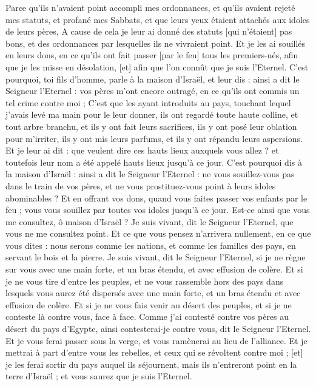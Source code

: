 \begin{multicols}{2}
Parce qu'ils n'avaient point accompli mes ordonnances, et qu'ils avaient rejeté mes statuts, et profané mes Sabbats, et que leurs yeux étaient attachés aux idoles de leurs pères,
A cause de cela je leur ai donné des statuts [qui n'étaient] pas bons, et des ordonnances par lesquelles ils ne vivraient point.
Et je les ai souillés en leurs dons, en ce qu'ils ont fait passer [par le feu] tous les premiers-nés, afin que je les misse en désolation, [et] afin que l'on connût que je suis l'Eternel.
C'est pourquoi, toi fils d'homme, parle à la maison d'Israël, et leur dis : ainsi a dit le Seigneur l'Eternel : vos pères m'ont encore outragé, en ce qu'ils ont commis un tel crime contre moi ;
C'est que les ayant introduits au pays, touchant lequel j'avais levé ma main pour le leur donner, ils ont regardé toute haute colline, et tout arbre branchu, et ils y ont fait leurs sacrifices, ils y ont posé leur oblation pour m'irriter, ils y ont mis leurs parfums, et ils y ont répandu leurs aspersions.
Et je leur ai dit : que veulent dire ces hauts lieux auxquels vous allez ? et toutefois leur nom a été appelé hauts lieux jusqu'à ce jour.
C'est pourquoi dis à la maison d'Israël : ainsi a dit le Seigneur l'Eternel : ne vous souillez-vous pas dans le train de vos pères, et ne vous prostituez-vous point à leurs idoles abominables ?
Et en offrant vos dons, quand vous faites passer vos enfants par le feu ; vous vous souillez par toutes vos idoles jusqu'à ce jour. Est-ce ainsi que vous me consultez, ô maison d'Israël ? Je suis vivant, dit le Seigneur l'Eternel, que vous ne me consultez point.
Et ce que vous pensez n'arrivera nullement, en ce que vous dites : nous serons comme les nations, et comme les familles des pays, en servant le bois et la pierre.
Je suis vivant, dit le Seigneur l'Eternel, si je ne règne sur vous avec une main forte, et un bras étendu, et avec effusion de colère.
Et si je ne vous tire d'entre les peuples, et ne vous rassemble hors des pays dans lesquels vous aurez été dispersés avec une main forte, et un bras étendu et avec effusion de colère.
Et si je ne vous fais venir au désert des peuples, et si je ne conteste là contre vous, face à face.
Comme j'ai contesté contre vos pères au désert du pays d'Egypte, ainsi contesterai-je contre vous, dit le Seigneur l'Eternel.
Et je vous ferai passer sous la verge, et vous ramènerai au lieu de l'alliance.
Et je mettrai à part d'entre vous les rebelles, et ceux qui se révoltent contre moi ; [et] je les ferai sortir du pays auquel ils séjournent, mais ils n'entreront point en la terre d'Israël ; et vous saurez que je suis l'Eternel.

\end{multicols}
